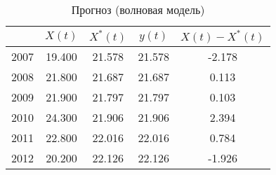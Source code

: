 \begin{table}[ht]
\centering
\begin{tabular}{r|cccc}
  \hline
 & $X(t)$ & $X^{*}(t)$ & $y(t)$ & $ X(t) - X^{*}(t) $ \\ 
  \hline
2007 & 19.400 & 21.578 & 21.578 & -2.178 \\ 
  2008 & 21.800 & 21.687 & 21.687 & 0.113 \\ 
  2009 & 21.900 & 21.797 & 21.797 & 0.103 \\ 
  2010 & 24.300 & 21.906 & 21.906 & 2.394 \\ 
  2011 & 22.800 & 22.016 & 22.016 & 0.784 \\ 
  2012 & 20.200 & 22.126 & 22.126 & -1.926 \\ 
   \hline
\end{tabular}
\caption{Прогноз (волновая модель)} 
\label{table:auto-rob-20-prediction}
\end{table}
